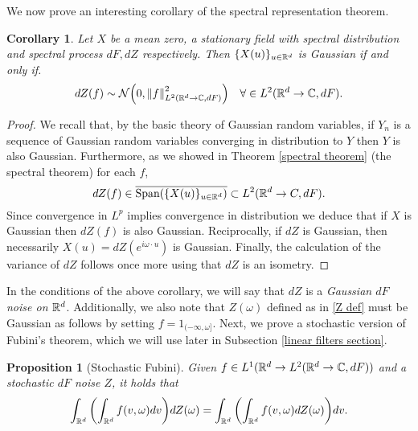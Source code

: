 \documentclass[12pt]{article}
\newtheorem{proposition}{Proposition}
\newtheorem{corollary}{Corollary}
\begin{document}
We now prove an interesting corollary of the spectral representation theorem.
\begin{corollary}\label{Gaussian integral}
    Let $X$ be a mean zero, a stationary field with  spectral distribution and spectral process $dF,dZ$ respectively. Then $\{X(u)\}_{u\in{\mathbb R}^d}$ is Gaussian if and only if.
    \begin{equation*}
        dZ(f)\sim\mathcal{N}\qty(0,\norm{f}^2_{L^2({\mathbb R}^d\to\mathbb{C},dF)})\quad\forall \in L^2({\mathbb R}^d\to\mathbb{C},dF).
    \end{equation*}
\end{corollary}
\begin{proof}
    We recall that, by the basic theory of Gaussian random variables, if $Y_n$ is a sequence of Gaussian random variables converging in distribution to $Y$ then $Y$ is also Gaussian. Furthermore, as we showed in Theorem \ref{spectral theorem} (the spectral theorem) for each $f$,
    $$dZ(f)\in\overline{\text{Span}(\{X(u)\}_{u\in{\mathbb R}^d})}\subset L^2({\mathbb R}^d\to C,dF).$$
    Since convergence in $L^p$ implies convergence in distribution we deduce that if $X$ is Gaussian then $dZ(f)$ is also Gaussian. Reciprocally, if $dZ$ is Gaussian, then necessarily $X(u)=dZ(e^{i\omega\cdot u})$ is Gaussian. Finally, the calculation of the variance of $dZ$ follows once more using that $dZ$ is an isometry.
\end{proof}
In the conditions of the above corollary, we will say that $dZ$ is a \emph{Gaussian $dF$ noise on ${\mathbb R}^d$}. Additionally, we also note that $Z(\omega)$ defined as in \eqref{Z def} must be Gaussian as follows by setting $f=1_{(-\infty,\omega]}$. Next, we prove a stochastic version of Fubini's theorem, which we will use later in Subsection \ref{linear filters section}.
\begin{proposition}[Stochastic Fubini]\label{stochastic Fbini}
    Given $f\in L^1({\mathbb R}^d\to L^2({\mathbb R}^d\to\mathbb{C},dF))$ and a stochastic $dF$ noise  $Z$, it holds that
    \begin{equation*}
        \int_{{\mathbb R}^d}\qty(\int_{{\mathbb R}^d}f(v,\omega)dv)dZ(\omega)=\int_{{\mathbb R}^d}\qty(\int_{{\mathbb R}^d}f(v,\omega)dZ(\omega))dv.
    \end{equation*}
\end{proposition}
\end{document}
